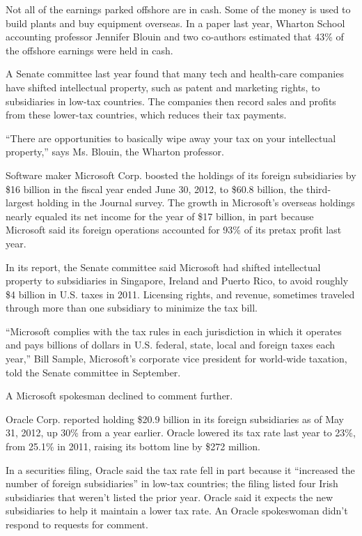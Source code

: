 \begin{select}
Not all of the earnings parked offshore are in cash. Some of the money is used to build plants and buy equipment overseas. In a paper last year, Wharton School accounting professor Jennifer Blouin and two co-authors estimated that 43\% of the offshore earnings were held in cash.

A Senate committee last year found that many tech and health-care companies have shifted intellectual property, such as patent and marketing rights, to subsidiaries in low-tax countries. The companies then record sales and profits from these lower-tax countries, which reduces their tax payments.

``There are opportunities to basically wipe away your tax on your intellectual property,'' says Ms. Blouin, the Wharton professor.

Software maker Microsoft Corp. boosted the holdings of its foreign subsidiaries by \$16 billion in the fiscal year ended June 30, 2012, to \$60.8 billion, the third-largest holding in the Journal survey. The growth in Microsoft's overseas holdings nearly equaled its net income for the year of \$17 billion, in part because Microsoft said its foreign operations accounted for 93\% of its pretax profit last year.

In its report, the Senate committee said Microsoft had shifted intellectual property to subsidiaries in Singapore, Ireland and Puerto Rico, to avoid roughly \$4 billion in U.S. taxes in 2011. Licensing rights, and revenue, sometimes traveled through more than one subsidiary to minimize the tax bill.

``Microsoft complies with the tax rules in each jurisdiction in which it operates and pays billions of dollars in U.S. federal, state, local and foreign taxes each year,'' Bill Sample, Microsoft's corporate vice president for world-wide taxation, told the Senate committee in September.

A Microsoft spokesman declined to comment further.

Oracle Corp. reported holding \$20.9 billion in its foreign subsidiaries as of May 31, 2012, up 30\% from a year earlier. Oracle lowered its tax rate last year to 23\%, from 25.1\% in 2011, raising its bottom line by \$272 million.

In a securities filing, Oracle said the tax rate fell in part because it ``increased the number of foreign subsidiaries'' in low-tax countries; the filing listed four Irish subsidiaries that weren't listed the prior year. Oracle said it expects the new subsidiaries to help it maintain a lower tax rate. An Oracle spokeswoman didn't respond to requests for comment.


\end{select}
